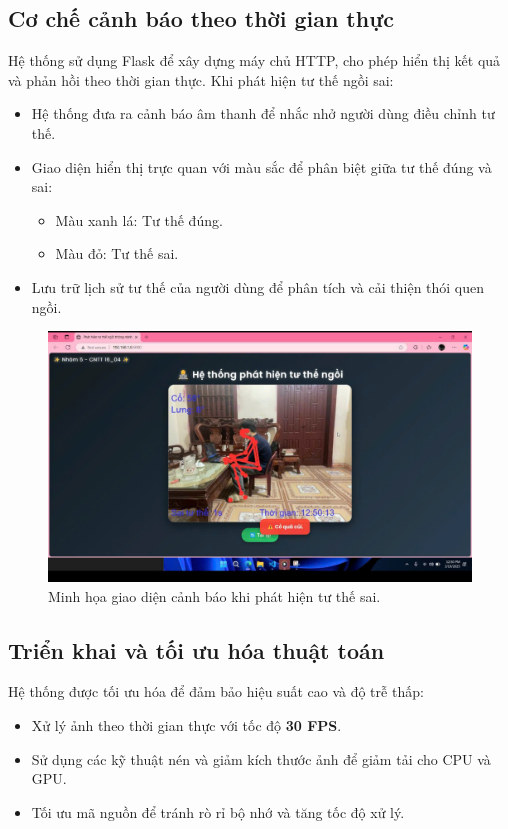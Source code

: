 \documentclass[conference]{IEEEtran}
\begin{document}
\subsection{Cơ chế cảnh báo theo thời gian thực}
Hệ thống sử dụng Flask để xây dựng máy chủ HTTP, cho phép hiển thị kết quả và phản hồi theo thời gian thực. Khi phát hiện tư thế ngồi sai:
\begin{itemize}
    \item Hệ thống đưa ra cảnh báo âm thanh để nhắc nhở người dùng điều chỉnh tư thế.
    \item Giao diện hiển thị trực quan với màu sắc để phân biệt giữa tư thế đúng và sai:
    \begin{itemize}
        \item Màu xanh lá: Tư thế đúng.
        \item Màu đỏ: Tư thế sai.
    \end{itemize}
    \item Lưu trữ lịch sử tư thế của người dùng để phân tích và cải thiện thói quen ngồi.
\end{itemize}

\begin{figure}[h]
    \centering
    \includegraphics[width=0.9\linewidth]{images/warning_display.png}
    \caption{Minh họa giao diện cảnh báo khi phát hiện tư thế sai.}
    \label{fig:warning_display}
\end{figure}

\subsection{Triển khai và tối ưu hóa thuật toán}
Hệ thống được tối ưu hóa để đảm bảo hiệu suất cao và độ trễ thấp:
\begin{itemize}
    \item Xử lý ảnh theo thời gian thực với tốc độ \textbf{30 FPS}.
    \item Sử dụng các kỹ thuật nén và giảm kích thước ảnh để giảm tải cho CPU và GPU.
    \item Tối ưu mã nguồn để tránh rò rỉ bộ nhớ và tăng tốc độ xử lý.
\end{itemize}
\end{document}
